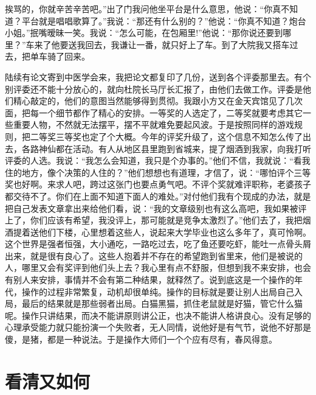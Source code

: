 \documentclass[12pt,oneside]{book}
\begin{document}
挨骂的，你就辛苦辛苦吧。''出了门我问他坐平台是什么意思，他说：``你真不知道？平台就是唱唱歌算了。''我说：``那还有什么别的？''他说：``你真不知道？炮台小姐。''抿嘴暧昧一笑。我说：``怎么可能，在包厢里!''他说：``那你说还要到哪里？''车来了他要送我回去，我谦让一番，就只好上了车。到了大院我又搭车过去，把单车骑了回来。

陆续有论文寄到中医学会来，我把论文都复印了几份，送到各个评委那里去。有个别评委还不能十分放心的，就向杜院长马厅长汇报了，由他们去做工作。评委是他们精心敲定的，他们的意图当然能够得到贯彻。我跟小方又在金天宾馆见了几次面，把每一个细节都作了精心的安排。一等奖的人选定了，二等奖就要考虑其它一些重要人物，不然就无法摆平，摆不平就难免要起风波。于是按照同样的游戏规则，把二等奖三等奖也定了个大概。今年的评奖升级了，这个信息不知怎么传了出去，各路神仙都在活动。有人从地区县里跑到省城来，提了烟酒到我家，向我打听评委的人选。我说：``我怎么会知道，我只是个办事的。''他们不信，我就说：``看我住的地方，像个决策的人住的？''他们想想也有道理，才信了，说：``哪怕评个三等奖也好啊。来求人吧，跨过这张门也要点勇气吧。不评个奖就难评职称，老婆孩子都交待不了。你们在上面不知道下面人的难处。''对付他们我有个现成的办法，就是把自己发表文章拿出来给他们看，说：``我的文章级别也有这么高吧，我如果被评上了，你们应该有希望，我没评上，那可能就是竞争太激烈了。''他们去了，我把烟酒提着送他们下楼，心里想着这些人，说起来大学毕业也这么多年了，真可怜啊。这个世界是强者恒强，大小通吃，一路吃过去，吃了鱼还要吃虾，能吐一点骨头屑出来，就是很有良心了。这些人抱着并不存在的希望跑到省里来，他们是被说的人，哪里又会有奖评到他们头上去？我心里有点不舒服，但想到我不来安排，也会有别人来安排，事情并不会有第二种结果，就释然了。说到底这是一个操作的年代，操作的过程非常繁复，动机却很单纯。操作的目标就是要让别人出局自己入局，最后的结果就是那些弱者出局。白猫黑猫，抓住老鼠就是好猫，管它什么猫呢。操作只讲结果，而决不能讲原则讲公正，也决不能讲人格讲良心。没有足够的心理承受能力就只能扮演一个失败者，无人同情，说他好是有气节，说他不好那是傻，是猪，都是一种说法。于是操作大师们一个个应有尽有，春风得意。


\chapter{看清又如何}
\end{document}
